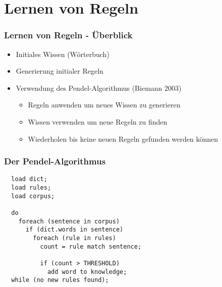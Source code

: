 \section{Lernen von Regeln}
\label{sec:itteratives-lernen}

\begin{frame}
  \frametitle{Lernen von Regeln - Überblick}

  \begin{itemize}
  \item Initiales Wissen (Wörterbuch)
  \item Generierung initialer Regeln
  \item Verwendung des Pendel-Algorithmus (Biemann 2003)
    \begin{itemize}
    \item Regeln anwenden um neues Wissen zu generieren
    \item Wissen verwenden um neue Regeln zu finden
    \item Wiederholen bis keine neuen Regeln gefunden werden können
    \end{itemize}
  \end{itemize}
\end{frame}

\begin{frame}[fragile]
  \frametitle{Der Pendel-Algorithmus}

  \begin{lstlisting}
  load dict;
  load rules;
  load corpus;
  
  do
    foreach (sentence in corpus)
      if (dict.words in sentence)
        foreach (rule in rules)
          count = rule match sentence;
          
          if (count > THRESHOLD)
            add word to knowledge;
  while (no new rules found);
  \end{lstlisting}
\end{frame}